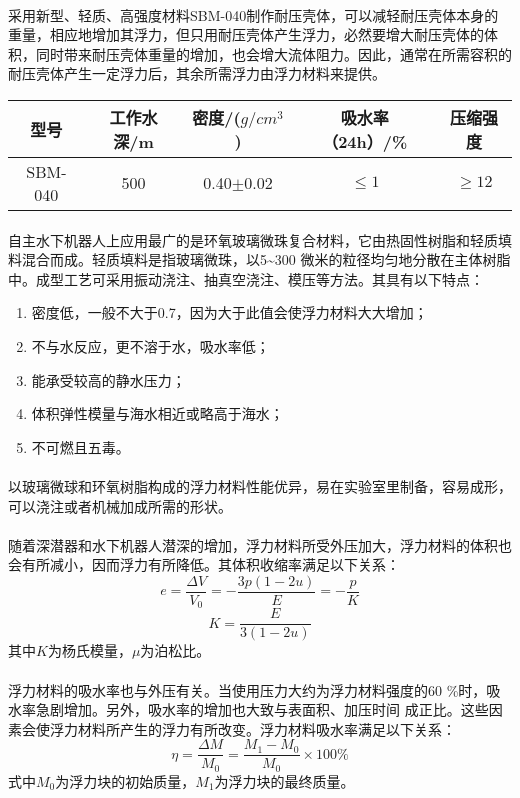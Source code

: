 \documentclass{ctexart}
\begin{document}
    \paragraph{}采用新型、轻质、高强度材料SBM-040制作耐压壳体，可以减轻耐压壳体本身的重量，相应地增加其浮力，但只用耐压壳体产生浮力，必然要增大耐压壳体的体积，同时带来耐压壳体重量的增加，也会增大流体阻力。因此，通常在所需容积的耐压壳体产生一定浮力后，其余所需浮力由浮力材料来提供。\\
    \begin{tabular}{|c|c|c|c|c|}
        \hline
        型号&工作水深/m&密度/($g/cm^3$)&吸水率（24h）/\%&压缩强度 \\
        \hline
        SBM-040&500&0.40$\pm$0.02&$\leqslant 1$&$\geqslant 12$ \\
        \hline
    \end{tabular}
    \paragraph{}自主水下机器人上应用最广的是环氧玻璃微珠复合材料，它由热固性树脂和轻质填料混合而成。轻质填料是指玻璃微珠，以5\~{}300 微米的粒径均匀地分散在主体树脂中。成型工艺可采用振动浇注、抽真空浇注、模压等方法。其具有以下特点：
    \begin{enumerate}
        \item 密度低，一般不大于0.7，因为大于此值会使浮力材料大大增加；
        \item 不与水反应，更不溶于水，吸水率低；
        \item 能承受较高的静水压力；
        \item 体积弹性模量与海水相近或略高于海水；
        \item 不可燃且五毒。
    \end{enumerate}
    \paragraph{}以玻璃微球和环氧树脂构成的浮力材料性能优异，易在实验室里制备，容易成形，可以浇注或者机械加成所需的形状。
    \paragraph{}随着深潜器和水下机器人潜深的增加，浮力材料所受外压加大，浮力材料的体积也会有所减小，因而浮力有所降低。其体积收缩率满足以下关系：
    \[e=\frac{\Delta V}{V_0}=-\frac{3p(1-2u)}{E}=-\frac{p}{K}\]
    \[K=\frac{E}{3(1-2u)}\]
    其中$K$为杨氏模量，$\mu$为泊松比。
    \paragraph{}浮力材料的吸水率也与外压有关。当使用压力大约为浮力材料强度的60
                \%时，吸水率急剧增加。另外，吸水率的增加也大致与表面积、加压时间
                成正比。这些因素会使浮力材料所产生的浮力有所改变。浮力材料吸水率满足以下关系：
    \[\eta=\frac{\Delta M}{M_0}=\frac{M_1-M_0}{M_0} \times 100\%\]
    式中$M_0$为浮力块的初始质量，$M_1$为浮力块的最终质量。
\end{document}
